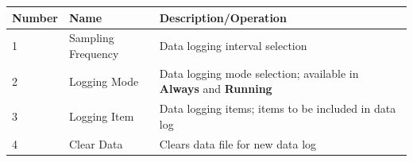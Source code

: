 \begin{longtable}[]{@{}lll@{}}
\toprule
\begin{minipage}[b]{0.04\columnwidth}\raggedright
Number\strut
\end{minipage} & \begin{minipage}[b]{0.23\columnwidth}\raggedright
Name\strut
\end{minipage} & \begin{minipage}[b]{0.65\columnwidth}\raggedright
Description/Operation\strut
\end{minipage}\tabularnewline
\midrule
\endhead
\begin{minipage}[t]{0.04\columnwidth}\raggedright
1\strut
\end{minipage} & \begin{minipage}[t]{0.23\columnwidth}\raggedright
Sampling Frequency\strut
\end{minipage} & \begin{minipage}[t]{0.65\columnwidth}\raggedright
Data logging interval selection\strut
\end{minipage}\tabularnewline
\begin{minipage}[t]{0.04\columnwidth}\raggedright
2\strut
\end{minipage} & \begin{minipage}[t]{0.23\columnwidth}\raggedright
Logging Mode\strut
\end{minipage} & \begin{minipage}[t]{0.65\columnwidth}\raggedright
Data logging mode selection; available in \textbf{Always} and
\textbf{Running}\strut
\end{minipage}\tabularnewline
\begin{minipage}[t]{0.04\columnwidth}\raggedright
3\strut
\end{minipage} & \begin{minipage}[t]{0.23\columnwidth}\raggedright
Logging Item\strut
\end{minipage} & \begin{minipage}[t]{0.65\columnwidth}\raggedright
Data logging items; items to be included in data log\strut
\end{minipage}\tabularnewline
\begin{minipage}[t]{0.04\columnwidth}\raggedright
4\strut
\end{minipage} & \begin{minipage}[t]{0.23\columnwidth}\raggedright
Clear Data\strut
\end{minipage} & \begin{minipage}[t]{0.65\columnwidth}\raggedright
Clears data file for new data log\strut
\end{minipage}\tabularnewline
\bottomrule
\end{longtable}

